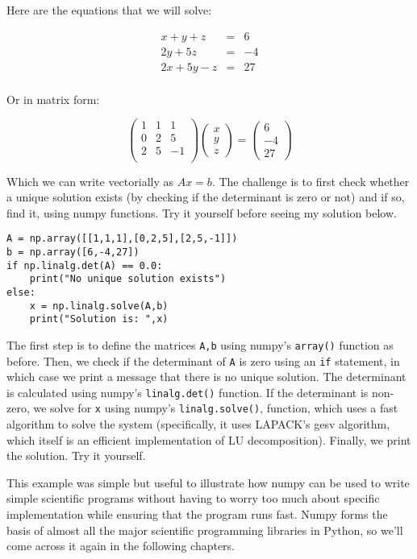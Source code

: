 \documentclass[12pt]{article}
\newcommand{\code}{\texttt}
\begin{document}
Here are the equations that we will solve:

$$
\begin{array}{lcl}
x+y+z&=&6 \\
2y+5z&=&-4 \\
2x+5y-z&=&27 \\
\end{array}
$$

Or in matrix form:

$$
\begin{pmatrix}
1 & 1 & 1 \\
0 & 2 & 5 \\
2 & 5 & -1 \\
\end{pmatrix}
\begin{pmatrix}
x \\ y \\ z
\end{pmatrix}
=
\begin{pmatrix}
6 \\ -4 \\ 27
\end{pmatrix}
$$

Which we can write vectorially as $Ax=b$. The challenge is to first check whether a unique solution exists (by checking if the determinant is zero or not) and if so, find it, using numpy functions. Try it yourself before seeing my solution below.

\begin{lstlisting}[frame=single] 
A = np.array([[1,1,1],[0,2,5],[2,5,-1]])
b = np.array([6,-4,27])
if np.linalg.det(A) == 0.0:
    print("No unique solution exists")
else:
    x = np.linalg.solve(A,b)
    print("Solution is: ",x)
\end{lstlisting}

The first step is to define the matrices \code{A,b} using numpy's \code{array()} function as before. Then, we check if the determinant of \code{A} is zero using an \code{if} statement, in which case we print a message that there is no unique solution. The determinant is calculated using numpy's \code{linalg.det()} function. If the determinant is non-zero, we solve for \code{x} using numpy's \code{linalg.solve()}, function, which uses a fast algorithm to solve the system (specifically, it uses LAPACK's gesv algorithm, which itself is an efficient implementation of LU decomposition). Finally, we print the solution. Try it yourself. 

This example was simple but useful to illustrate how numpy can be used to write simple scientific programs without having to worry too much about specific implementation while ensuring that the program runs fast. Numpy forms the basis of almost all the major scientific programming libraries in Python, so we'll come across it again in the following chapters.
\end{document}
